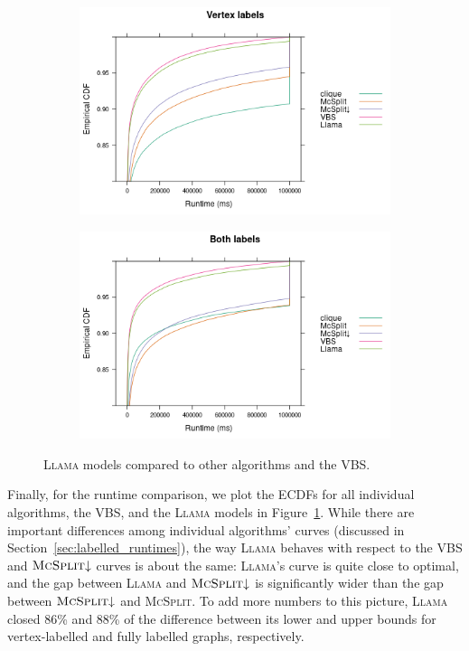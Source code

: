 \documentclass{l4proj}
\theoremstyle{definition}
\theoremstyle{remark}
\begin{document}
\begin{figure}
  \centering
  \begin{subfigure}[t]{0.49\textwidth}
    \centering
    \includegraphics[width=\textwidth]{images/ecdf_vertex_labels_llama.png}
  \end{subfigure}
  \begin{subfigure}[t]{0.49\textwidth}
    \centering
    \includegraphics[width=\textwidth]{images/ecdf_both_labels_llama.png}
  \end{subfigure}
  \caption{\textsc{Llama} models compared to other algorithms and the VBS.}
  \label{fig:ecdf_llama}
\end{figure}

Finally, for the runtime comparison, we plot the ECDFs for all individual
algorithms, the VBS, and the \textsc{Llama} models in
Figure~\ref{fig:ecdf_llama}. While there are important differences among
individual algorithms' curves (discussed in
Section~\ref{sec:labelled_runtimes}), the way \textsc{Llama} behaves with
respect to the VBS and $\textsc{McSplit}{\downarrow}$ curves is about the same:
\textsc{Llama}'s curve is quite close to optimal, and the gap between
\textsc{Llama} and $\textsc{McSplit}{\downarrow}$ is significantly wider than
the gap between $\textsc{McSplit}{\downarrow}$ and \textsc{McSplit}. To add more
numbers to this picture, \textsc{Llama} closed 86\% and 88\% of the difference
between its lower and upper bounds for vertex-labelled and fully labelled
graphs, respectively.
\end{document}
